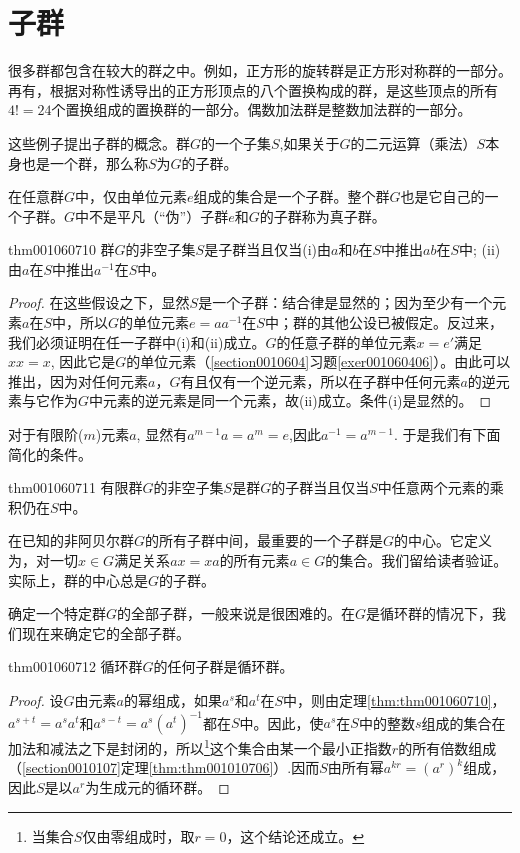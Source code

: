 \section{子群}\label{section0010607}
很多群都包含在较大的群之中。例如，正方形的旋转群是正方形对称群的一部分。再有，根据对称性诱导出的正方形顶点的八个置换构成的群，是这些顶点的所有$4!=24$个置换组成的置换群的一部分。偶数加法群是整数加法群的一部分。

这些例子提出子群的概念。群$G$的一个子集$S$,如果关于$G$的二元运算（乘法）$S$本身也是一个群，那么称$S$为$G$的子群。

在任意群$G$中，仅由单位元素$e$组成的集合是一个子群。整个群$G$也是它自己的一个子群。$G$中不是平凡（“伪”）子群$e$和$G$的子群称为真子群。

\begin{theorem}{}{thm001060710}
群$G$的非空子集$S$是子群当且仅当(i)由$a$和$b$在$S$中推出$ab$在$S$中; (ii)由$a$在$S$中推出$a^{-1}$在$S$中。
\end{theorem}

\begin{proof}
在这些假设之下，显然$S$是一个子群：结合律是显然的；因为至少有一个元素$a$在$S$中，所以$G$的单位元素$e = aa^{-1}$在$S$中；群的其他公设已被假定。反过来，我们必须证明在任一子群中(i)和(ii)成立。$G$的任意子群的单位元素$x=e'$满足$xx=x$, 因此它是$G$的单位元素（\ref{section0010604}习题\ref{exer001060406}）。由此可以推出，因为对任何元素$a$，$G$有且仅有一个逆元素，所以在子群中任何元素$a$的逆元素与它作为$G$中元素的逆元素是同一个元素，故(ii)成立。条件(i)是显然的。
\end{proof}

对于有限阶($m$)元素$a$, 显然有$a^{m-1}a = a^m=e$,因此$a^{-1}=a^{m-1}$. 于是我们有下面简化的条件。
\begin{theorem}{}{thm001060711}
有限群$G$的非空子集$S$是群$G$的子群当且仅当$S$中任意两个元素的乘积仍在$S$中。
\end{theorem}

在已知的非阿贝尔群$G$的所有子群中间，最重要的一个子群是$G$的中心。它定义为，对一切$x \in G$满足关系$ax=xa$的所有元素$a \in G$的集合。我们留给读者验证。实际上，群的中心总是$G$的子群。

确定一个特定群$G$的全部子群，一般来说是很困难的。在$G$是循环群的情况下，我们现在来确定它的全部子群。

\begin{theorem}{}{thm001060712}
循环群$G$的任何子群是循环群。
\end{theorem}

\begin{proof}
设$G$由元素$a$的幂组成，如果$a^s$和$a^t$在$S$中，则由定理\ref{thm:thm001060710}，$a^{s+t}=a^sa^t$和$a^{s-t}=a^s(a^t)^{-1}$都在$S$中。因此，使$a^s$在$S$中的整数$s$组成的集合在加法和减法之下是封闭的，所以\footnote{当集合$S$仅由零组成时，取$r=0$，这个结论还成立。}这个集合由某一个最小正指数$r$的所有倍数组成（\ref{section0010107}定理\ref{thm:thm001010706}）.因而$S$由所有幂$a^{kr}=(a^{r})^k$组成，因此$S$是以$a^r$为生成元的循环群。
\end{proof}

